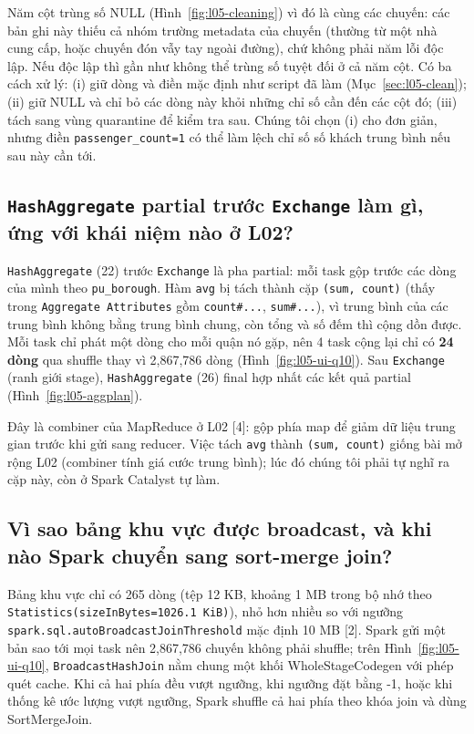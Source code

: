 \documentclass[
  12pt,
  a4paper,
]{article}
\begin{document}
Năm cột trùng số NULL (Hình~\ref{fig:l05-cleaning}) vì đó là cùng các
chuyến: các bản ghi này thiếu cả nhóm trường metadata của chuyến (thường
từ một nhà cung cấp, hoặc chuyến đón vẫy tay ngoài đường), chứ không
phải năm lỗi độc lập. Nếu độc lập thì gần như không thể trùng số tuyệt
đối ở cả năm cột. Có ba cách xử lý: (i) giữ dòng và điền mặc định như
script đã làm (Mục~\ref{sec:l05-clean}); (ii) giữ NULL và chỉ bỏ các
dòng này khỏi những chỉ số cần đến các cột đó; (iii) tách sang vùng
quarantine để kiểm tra sau. Chúng tôi chọn (i) cho đơn giản, nhưng điền
\texttt{passenger\_}\allowbreak{}\texttt{count=}\allowbreak{}\texttt{1}\allowbreak{}
có thể làm lệch chỉ số số khách trung bình nếu sau này cần tới.

\subsection{\texorpdfstring{\texttt{HashAggregate} partial trước
\texttt{Exchange} làm gì, ứng với khái niệm nào ở
L02?}{HashAggregate partial trước Exchange làm gì, ứng với khái niệm nào ở L02?}}\label{sec:l05-q5}

\texttt{HashAggregate} (22) trước \texttt{Exchange} là pha partial: mỗi
task gộp trước các dòng của mình theo \texttt{pu\_borough}. Hàm
\texttt{avg} bị tách thành cặp \texttt{(sum,\ count)} (thấy trong
\texttt{Aggregate\ Attributes}\allowbreak{} gồm \texttt{count\#...},
\texttt{sum\#...}), vì trung bình của các trung bình không bằng trung
bình chung, còn tổng và số đếm thì cộng dồn được. Mỗi task chỉ phát một
dòng cho mỗi quận nó gặp, nên 4 task cộng lại chỉ có \textbf{24 dòng}
qua shuffle thay vì 2,867,786 dòng (Hình~\ref{fig:l05-ui-q10}). Sau
\texttt{Exchange} (ranh giới stage), \texttt{HashAggregate} (26) final
hợp nhất các kết quả partial (Hình~\ref{fig:l05-aggplan}).

Đây là combiner của MapReduce ở L02 {[}4{]}: gộp phía map để giảm dữ
liệu trung gian trước khi gửi sang reducer. Việc tách \texttt{avg} thành
\texttt{(sum,\ count)} giống bài mở rộng L02 (combiner tính giá cước
trung bình); lúc đó chúng tôi phải tự nghĩ ra cặp này, còn ở Spark
Catalyst tự làm.

\subsection{Vì sao bảng khu vực được broadcast, và khi nào Spark chuyển
sang sort-merge join?}\label{sec:l05-q6}

Bảng khu vực chỉ có 265 dòng (tệp 12 KB, khoảng 1 MB trong bộ nhớ theo
\texttt{Statistics(sizeInBytes=}\allowbreak{}\texttt{1026.}\allowbreak{}\texttt{1\ KiB)}\allowbreak{}),
nhỏ hơn nhiều so với ngưỡng
\texttt{spark.}\allowbreak{}\texttt{sql.}\allowbreak{}\texttt{autoBroadcastJoinThreshold}\allowbreak{}
mặc định 10 MB {[}2{]}. Spark gửi một bản sao tới mọi task nên 2,867,786
chuyến không phải shuffle; trên Hình~\ref{fig:l05-ui-q10},
\texttt{BroadcastHashJoin}\allowbreak{} nằm chung một khối
WholeStageCodegen với phép quét cache. Khi cả hai phía đều vượt ngưỡng,
khi ngưỡng đặt bằng -1, hoặc khi thống kê ước lượng vượt ngưỡng, Spark
shuffle cả hai phía theo khóa join và dùng SortMergeJoin.
\end{document}
